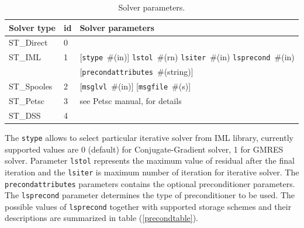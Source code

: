 \documentclass[a4paper]{article}
\newcommand{\param}[1]{\texttt{#1}} %
\newcommand{\optional}[1]{[#1]} %
\newcommand{\field}[2]{\param{#1}~\#{\tiny(#2)}} %
\newcommand{\optField}[2]{\optional{\field{#1}{#2}}}
\begin{document}
\begin{table}[ht]
\begin{center}
\begin{tabular}{|l|l|l|}
\hline
Solver type & id & Solver parameters \\
\hline
ST\_Direct  &0&\\
ST\_IML     &1& \optField{stype}{in} \field{lstol}{rn} \field{lsiter}{in}
\field{lsprecond}{in}\\
                  & &  \optField{precondattributes}{string}\\

ST\_Spooles &2&  \optField{msglvl}{in} \optField{msgfile}{s}\\
ST\_Petsc   &3& see Petsc manual, for details\footnotemark\\
ST\_DSS     &4& \\
\hline
\end{tabular}
\caption{Solver parameters.}
\label{sparsesolverparams}
\end{center}
\end{table}
The \param{stype} allows to select particular iterative solver from IML library, currently supported values are 0 (default) for Conjugate-Gradient solver, 1 for GMRES solver. Parameter \param{lstol} represents the maximum value of residual after the
final iteration and the \param{lsiter} is maximum number of iteration for iterative solver.
The \param{precondattributes} parameters contains the optional
preconditioner parameters.
The \param{lsprecond} parameter determines the type of preconditioner to be
used. The possible values of \param{lsprecond} together with supported
storage schemes and their descriptions are summarized in table
(\ref{precondtable}).
\end{document}
